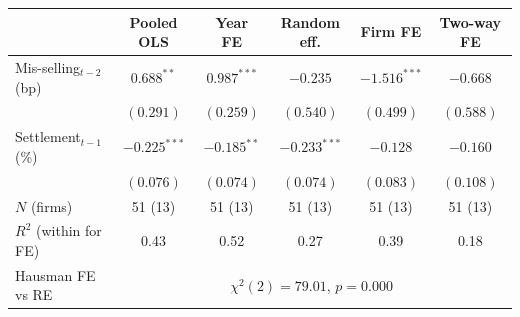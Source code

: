 \begin{tabular}{lccccc}
\toprule
 & Pooled OLS & Year FE & Random eff. & Firm FE & Two-way FE \\
\midrule
Mis-selling$_{t-2}$ (bp) & $0.688^{**}$ & $0.987^{***}$ & $-0.235$ & $-1.516^{***}$ & $-0.668$ \\
 & $(0.291)$ & $(0.259)$ & $(0.540)$ & $(0.499)$ & $(0.588)$ \\
Settlement$_{t-1}$ (\%) & $-0.225^{***}$ & $-0.185^{**}$ & $-0.233^{***}$ & $-0.128$ & $-0.160$ \\
 & $(0.076)$ & $(0.074)$ & $(0.074)$ & $(0.083)$ & $(0.108)$ \\
\midrule
$N$ (firms) & 51 (13) & 51 (13) & 51 (13) & 51 (13) & 51 (13) \\
$R^2$ (within for FE) & 0.43 & 0.52 & 0.27 & 0.39 & 0.18 \\
Hausman FE vs RE & \multicolumn{5}{c}{$\chi^2(2)=79.01$, $p=0.000$} \\
\bottomrule
\end{tabular}